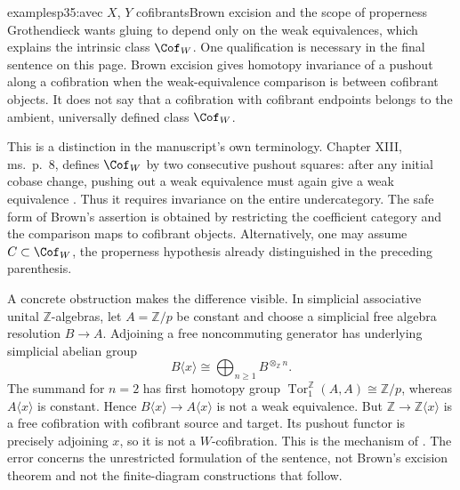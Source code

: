 \begin{dcomment}{examples}{p35:avec $X$, $Y$ cofibrants}{Brown excision and the scope of properness}
Grothendieck wants gluing to depend only on the weak equivalences, which explains the intrinsic class $\Cof_W$. One qualification is necessary in the final sentence on this page. Brown excision gives homotopy invariance of a pushout along a cofibration when the weak-equivalence comparison is between cofibrant objects. It does not say that a cofibration with cofibrant endpoints belongs to the ambient, universally defined class $\Cof_W$.

This is a distinction in the manuscript's own terminology. Chapter XIII, ms.~p.~8, defines $\Cof_W$ by two consecutive pushout squares: after any initial cobase change, pushing out a weak equivalence must again give a weak equivalence \citep[Ch.~XIII, ms.~p.~8]{Grothendieck1990XIII}. Thus it requires invariance on the entire undercategory. The safe form of Brown's assertion is obtained by restricting the coefficient category and the comparison maps to cofibrant objects. Alternatively, one may assume $C\subset\Cof_W$, the properness hypothesis already distinguished in the preceding parenthesis.

A concrete obstruction makes the difference visible. In simplicial associative unital $\mathbb Z$-algebras, let $A=\mathbb Z/p$ be constant and choose a simplicial free algebra resolution $B\longrightarrow A$. Adjoining a free noncommuting generator has underlying simplicial abelian group
\[
 B\langle x\rangle\cong\bigoplus_{n\geq1}B^{\otimes_{\mathbb Z} n}.
\]
The summand for $n=2$ has first homotopy group
$\operatorname{Tor}^{\mathbb Z}_1(A,A)\cong\mathbb Z/p$, whereas
$A\langle x\rangle$ is constant. Hence
$B\langle x\rangle\longrightarrow A\langle x\rangle$ is not a weak equivalence. But $\mathbb Z\longrightarrow\mathbb Z\langle x\rangle$ is a free cofibration with cofibrant source and target. Its pushout functor is precisely adjoining $x$, so it is not a $W$-cofibration. This is the mechanism of \citet[Example 2.11, arXiv version]{Rezk2002Proper}. The error concerns the unrestricted formulation of the sentence, not Brown's excision theorem and not the finite-diagram constructions that follow.
\end{dcomment}


